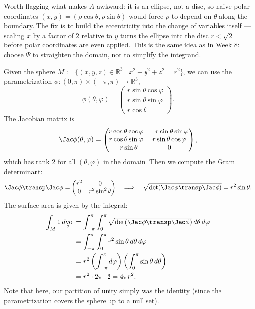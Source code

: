 \begin{ainote}
Worth flagging what makes $A$ awkward: it is an ellipse, not a disc, so naive polar
coordinates $(x,y)=(\rho\cos\theta,\rho\sin\theta)$ would force $\rho$ to depend on $\theta$
along the boundary. The fix is to build the eccentricity into the change of variables itself
--- scaling $x$ by a factor of $2$ relative to $y$ turns the ellipse into the disc $r<\sqrt2$
before polar coordinates are even applied. This is the same idea as
 in Week 8: choose $\Psi$ to straighten the domain, not
to simplify the integrand.
\end{ainote}

\begin{example}
\label{ex:surface_area_sphere}
Given the sphere $M := \{(x,y,z) \in \mathbb{R}^3 \mid x^2+y^2+z^2 = r^2\}$, we can use the parametrization $\phi : (0,\pi) \times (-\pi,\pi) \to \mathbb{R}^3$,
\[\phi(\theta,\varphi) = \begin{pmatrix} r\sin\theta\cos\varphi \\ r\sin\theta\sin\varphi \\ r\cos\theta \end{pmatrix}.\]
The Jacobian matrix is
\[\Jac\phi(\theta,\varphi) = \begin{pmatrix} r\cos\theta\cos\varphi & -r\sin\theta\sin\varphi \\ r\cos\theta\sin\varphi & r\sin\theta\cos\varphi \\ -r\sin\theta & 0 \end{pmatrix},\]
which has rank 2 for all $(\theta,\varphi)$ in the domain.
Then we compute the Gram determinant:
\[\Jac\phi\transp \Jac\phi = \begin{pmatrix} r^2 & 0 \\ 0 & r^2\sin^2\theta \end{pmatrix} \quad \Longrightarrow \quad \sqrt{\det(\Jac\phi\transp \Jac\phi)} = r^2\sin\theta.\]
The surface area is given by the integral:
\begin{align*}
\int_M 1 \mathop{d\text{vol}}_2 &= \int_{-\pi}^\pi \int_0^\pi \sqrt{\det(\Jac\phi\transp \Jac\phi)} \,d\theta\,d\varphi \\
&= \int_{-\pi}^\pi \int_0^\pi r^2\sin\theta \,d\theta\,d\varphi \\
&= r^2 \left(\int_{-\pi}^\pi d\varphi\right) \left(\int_0^\pi \sin\theta \,d\theta\right) \\
&= r^2 \cdot 2\pi \cdot 2 = 4\pi r^2.
\end{align*}
Note that here, our partition of unity simply was the identity (since the parametrization covers the sphere up to a null set).


\end{example}
